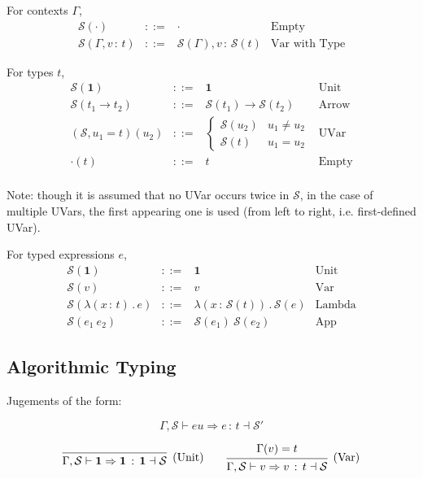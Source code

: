 \documentclass{article}
\newcommand{\define}{::=}
\newcommand{\G}{\Gamma}
\newcommand{\St}{\mathcal{S}}
\newcommand{\unit}{\mathbf{1}}
\newcommand{\tp}{t}
\newcommand{\uv}{u}
\newcommand{\eu}{eu}
\newcommand{\e}{e}
\newcommand{\x}{x}
\newcommand{\var}{v}
\newcommand{\nil}{\cdot}
\newcommand{\spc}{\qquad}
\renewcommand{\implies}{\Rightarrow}
\newcommand{\withtp}[2]{{#1} \,:\, {#2}}
\newcommand{\app}[2]{{#1}\ {#2}}
\newcommand{\lamtp}[3]{\lambda \left( {\withtp {#1} {#2}} \right) \,.\, {#3}}
\newcommand{\arr}[2]{{#1} \to {#2}}
\newcommand{\algtp}[6]{#1, #2 \vdash #3 \implies {\withtp {#4} {#5}} \dashv #6}
\newcommand{\deduct}[3][]
{
  \begin{prooftree}
    \hypo{#2}
    \infer1[\text{#1}]{#3}
  \end{prooftree}
}
\begin{document}
For contexts \(\G\),
\[
  \begin{array}{rcll}
    \St(\nil) & \define & \nil & \text{Empty} \\
    \St(\G, {\withtp \var \tp}) & \define & \St(\G), {\withtp \var {\St(\tp)}} &
    \text{Var with Type}
  \end{array}
\]

For types \(\tp\),
\[
  \begin{array}{rcll}
    \St(\unit) & \define & \unit & \text{Unit} \\
    \St(\arr {\tp_1} {\tp_2}) & \define   & \arr {\St(\tp_1)} {\St(\tp_2)} & \text{Arrow}  \\
    \left( \St, {\uv_1} = \tp \right)({\uv_2}) & \define & \begin{cases}
    \St({\uv_2}) & {\uv_1} \ne {\uv_2} \\ \St(\tp) & {\uv_1} = {\uv_2}
    \end{cases} & \text{UVar} \\
    \nil(\tp) & \define & \tp & \text{Empty} \\
  \end{array}
\]

Note: though it is assumed that no UVar occurs twice in \(\St\), in the case of
multiple UVars, the first appearing one is used (from left to right, i.e. first-defined
UVar).

For typed expressions \(\e\),
\[
  \begin{array}{rcll}
    \St(\unit)  & \define & \unit & \text{Unit} \\
    \St(\var) & \define   & \var  & \text{Var}  \\
    \St(\lamtp \x \tp \e) & \define    & \lamtp \x {\St(\tp)} {\St(\e)} & \text{Lambda} \\
    \St(\app {\e_1} {\e_2}) & \define    & \app {\St(\e_1)} {\St(\e_2)} & \text{App}
  \end{array}
\]

\subsection{Algorithmic Typing}

Jugements of the form:

\[ \algtp \G \St \eu \e \tp \St' \]

\[
  \deduct
  {}
  {\algtp \G \St \unit \unit \unit \St}
  {\text{(Unit)}}
  \spc
  \deduct
  {\G(\var) = \tp}
  {\algtp \G \St \var \var \tp \St}
  {\text{(Var)}}
\]
\end{document}
